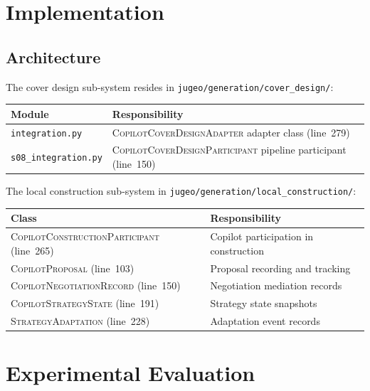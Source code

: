 \documentclass[11pt]{article}
\newcommand{\CovAdapt}{\textsc{CopilotCoverDesignAdapter}}
\newcommand{\CovPart}{\textsc{CopilotCoverDesignParticipant}}
\newcommand{\ConstrPart}{\textsc{CopilotConstructionParticipant}}
\newcommand{\CopProp}{\textsc{CopilotProposal}}
\newcommand{\CopNeg}{\textsc{CopilotNegotiationRecord}}
\newcommand{\CopStrat}{\textsc{CopilotStrategyState}}
\newcommand{\StratAdapt}{\textsc{StrategyAdaptation}}
\begin{document}
\section{Implementation}\label{sec:impl}

\subsection{Architecture}

The cover design sub-system resides in \texttt{jugeo/generation/cover\_design/}:

\begin{center}
\begin{tabular}{ll}
\toprule
\textbf{Module} & \textbf{Responsibility} \\
\midrule
\texttt{integration.py}      & \CovAdapt{} adapter class (line~279) \\
\texttt{s08\_integration.py} & \CovPart{} pipeline participant (line~150) \\
\bottomrule
\end{tabular}
\end{center}

The local construction sub-system in
\texttt{jugeo/generation/local\_construction/}:

\begin{center}
\begin{tabular}{ll}
\toprule
\textbf{Class} & \textbf{Responsibility} \\
\midrule
\ConstrPart{} (line~265) & Copilot participation in construction \\
\CopProp{} (line~103)    & Proposal recording and tracking \\
\CopNeg{} (line~150)     & Negotiation mediation records \\
\CopStrat{} (line~191)   & Strategy state snapshots \\
\StratAdapt{} (line~228) & Adaptation event records \\
\bottomrule
\end{tabular}
\end{center}

\section{Experimental Evaluation}\label{sec:eval}
\end{document}
